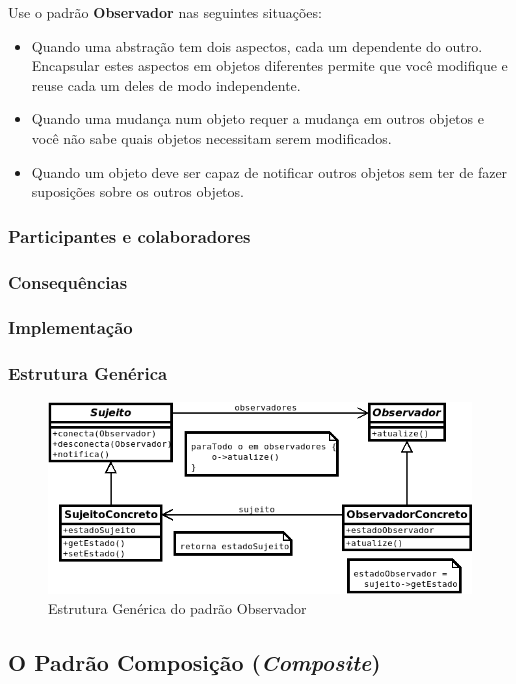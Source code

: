 Use o padrão \textbf{Observador} nas seguintes situações:
\begin{itemize}
\item Quando uma abstração tem dois aspectos, cada um dependente do outro. Encapsular estes aspectos em objetos diferentes permite que você modifique e reuse cada um deles de modo independente.
\item Quando uma mudança num objeto requer a mudança em outros objetos e você não sabe quais objetos necessitam serem modificados.
\item Quando um objeto deve ser capaz de notificar outros objetos sem ter de fazer suposições sobre os outros objetos.
\end{itemize}

\subsubsection{Participantes e colaboradores}
\subsubsection{Consequências}
\subsubsection{Implementação}
\subsubsection{Estrutura Genérica}

\begin{figure}[h]
\begin{center}
\includegraphics[scale=0.5]{dp_observer.png}
\caption{Estrutura Genérica do padrão Observador}\label{fig:adaptador}
\end{center}
\end{figure}


\subsection{O Padrão Composição (\textit{Composite})}
